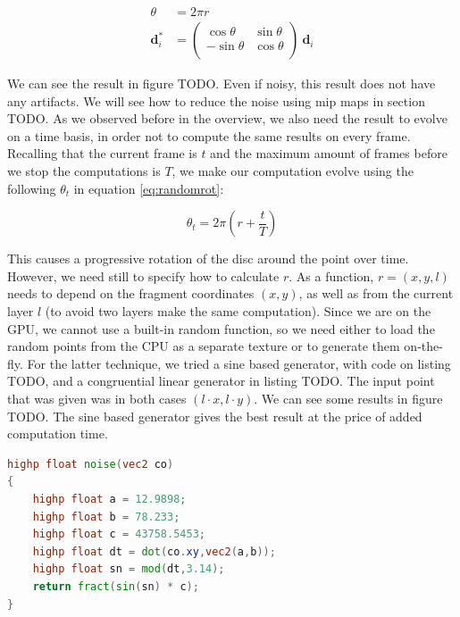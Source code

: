 \renewcommand{\arraystretch}{1}
\begin{equation}
\begin{split}
\theta &= 2 \pi r \\
\mathbf{d}_i^* &= \left(\begin{array}{cc}
\cos\theta & \sin\theta \\
-\sin\theta & \cos\theta \\
\end{array} \right) \ \mathbf{d}_i
\end{split}
\label{eq:randomrot}
\end{equation}
\renewcommand{\arraystretch}{1.8}

We can see the result in figure TODO. Even if noisy, this result does not have any artifacts. We will see how to reduce the noise using mip maps in section TODO. As we observed before in the overview, we also need the result to evolve on a time basis, in order not to compute the same results on every frame. Recalling that the current frame is $t$ and the maximum amount of frames before we stop the computations is $T$, we make our computation evolve using the following $\theta_t$ in equation \ref{eq:randomrot}:

$$
\theta_t = 2 \pi \left(r + \frac{t}{T}\right)
$$

This causes a progressive rotation of the disc around the point over time. However, we need still to specify how to calculate $r$. As a function, $r = (x,y,l)$ needs to depend on the fragment coordinates $(x,y)$, as well as from the current layer $l$ (to avoid two layers make the same computation). Since we are on the GPU, we cannot use a built-in random function, so we need either to load the random points from the CPU as a separate texture or to generate them on-the-fly. For the latter technique, we tried a sine based generator, with code on listing TODO, and a congruential linear generator in listing TODO. The input point that was given was in both cases $(l \cdot x, l \cdot y)$. We can see some results in figure TODO. The sine based generator gives the best result at the price of added computation time.

\begin{lstlisting}[language=GLSL,label=lst:sinegenerator,caption={Sine-based generation of random points on the GPU.}]
highp float noise(vec2 co)
{
    highp float a = 12.9898;
    highp float b = 78.233;
    highp float c = 43758.5453;
    highp float dt = dot(co.xy,vec2(a,b));
    highp float sn = mod(dt,3.14);
    return fract(sin(sn) * c);
}
\end{lstlisting}


